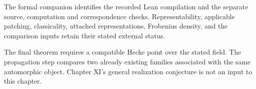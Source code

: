 The formal companion identifies the recorded Lean compilation and the separate source, computation and correspondence checks. Representability, applicable patching, classicality, attached representations, Frobenius density, and the comparison inputs retain their stated external status.

The final theorem requires a compatible Hecke point over the stated field. The propagation step compares two already existing families associated with the same automorphic object. Chapter XI's general realization conjecture is not an input to this chapter.
\clearpage
{\setlength{\parskip}{0pt}\tableofcontents}
\clearpage
